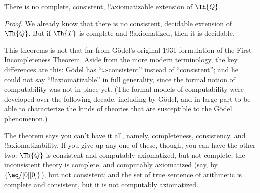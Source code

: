\documentclass[../../../include/open-logic-section]{subfiles}
\begin{document}

\begin{thm}
There is no complete, consistent, !!{axiomatizable} extension of
$\Th{Q}$.
\end{thm}

\begin{proof}
We already know that there is no consistent, decidable extension of
$\Th{Q}$. But if $\Th{T}$ is complete and !!{axiomatized}, then
it is decidable. 
\end{proof}

\begin{explain}
This theorems is not that far from G\"odel's original 1931 formulation
of the First Incompleteness Theorem. Aside from the more modern
terminology, the key differences are this: G\"odel has
``$\omega$-consistent'' instead of ``consistent''; and he could not
say ``!!{axiomatizable}'' in full generality, since the formal
notion of computability was not in place yet. (The formal models of
computability were developed over the following decade, including by
G\"odel, and in large part to be able to characterize the kinds of
theories that are susceptible to the G\"odel phenomenon.)

The theorem says you can't have it all, namely, completeness,
consistency, and !!{axiomatizability}. If you give up any one of
these, though, you can have the other two: $\Th{Q}$ is consistent and
computably axiomatized, but not complete; the inconsistent theory is
complete, and computably axiomatized (say, by $\{ \eq/[0][0] \}$), but
not consistent; and the set of true sentence of arithmetic is complete
and consistent, but it is not computably axiomatized.
\end{explain}
\end{document}
